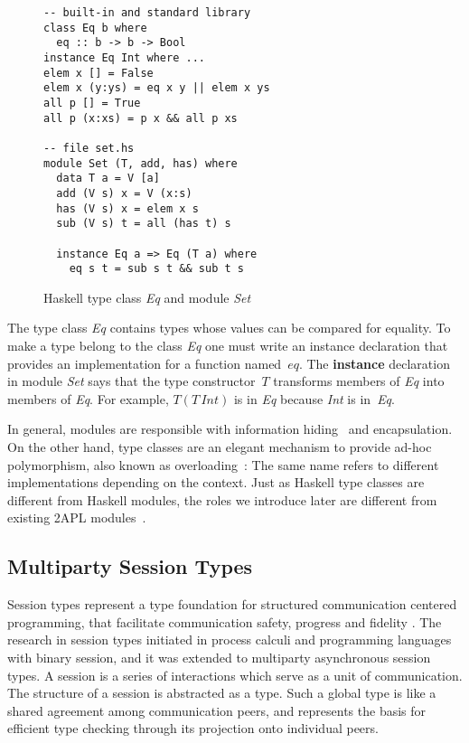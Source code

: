 \documentclass[a4paper,12pt,oneside,fleqn]{book} %
\begin{document}
\begin{figure}\footnotesize %
\begin{verbatim}
-- built-in and standard library
class Eq b where
  eq :: b -> b -> Bool
instance Eq Int where ...
elem x [] = False
elem x (y:ys) = eq x y || elem x ys
all p [] = True
all p (x:xs) = p x && all p xs

-- file set.hs
module Set (T, add, has) where
  data T a = V [a]
  add (V s) x = V (x:s)
  has (V s) x = elem x s
  sub (V s) t = all (has t) s

  instance Eq a => Eq (T a) where
    eq s t = sub s t && sub t s
\end{verbatim}
\caption{Haskell type class \textit{Eq} and module \textit{Set}}
\label{fig:haskell}
\end{figure} %


The type class \textit{Eq} contains types whose values can be compared for
equality. To make a type belong to the class \textit{Eq} one must write an
instance declaration that provides an implementation for a function
named~$eq$. The \textbf{instance} declaration in module \textit{Set} says
that the type constructor~$T$ transforms members of \textit{Eq} into
members of \textit{Eq}. For example, $T(T\,\mathit{Int})$ is in \textit{Eq}
because \textit{Int} is in~\textit{Eq}.

In general, modules are responsible with information
hiding~\cite{DBLP:journals/cacm/Parnas72a} and encapsulation.  On the other
hand, type classes are an elegant mechanism to provide ad-hoc polymorphism,
also known as overloading~\cite{DBLP:conf/popl/WadlerB89}: The same name
refers to different implementations depending on the context.  Just as
Haskell type classes are different from Haskell modules, the roles we
introduce later are different from existing 2APL
modules~\cite{dblp:conf/prima/dastanims08}.


\subsection{Multiparty Session Types} %

Session types represent a type foundation for structured communication
centered programming, that facilitate communication safety, progress and
fidelity \cite{dblp:conf/popl/hondayc08}. The research in session types
initiated in process calculi and programming languages with binary session,
and it was extended to multiparty asynchronous session types. A session is
a series of interactions which serve as a unit of communication. The
structure of a session is abstracted as a type. Such a global type is like
a shared agreement among communication peers, and represents the basis for
efficient type checking through its projection onto individual peers.
\end{document}
